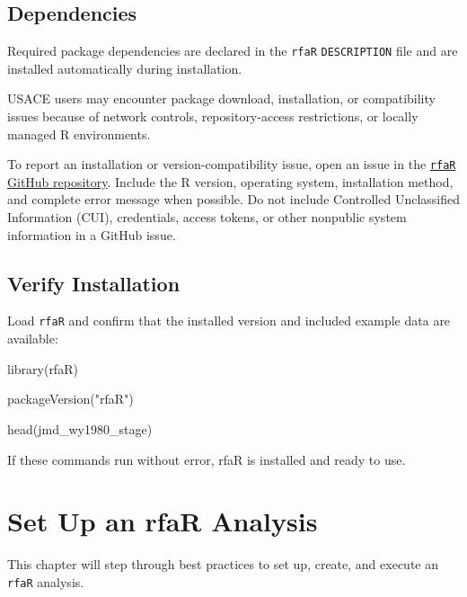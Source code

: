 \documentclass[
  letterpaper,
  DIV=11,
  numbers=noendperiod]{scrreprt}
\newenvironment{Shaded}{\begin{snugshade}}{\end{snugshade}}
\newcommand{\FunctionTok}[1]{\textcolor[rgb]{0.28,0.35,0.67}{#1}}
\newcommand{\NormalTok}[1]{\textcolor[rgb]{0.00,0.23,0.31}{#1}}
\newcommand{\StringTok}[1]{\textcolor[rgb]{0.13,0.47,0.30}{#1}}
\begin{document}
\section{Dependencies}\label{dependencies}

Required package dependencies are declared in the \texttt{rfaR}
\texttt{DESCRIPTION} file and are installed automatically during
installation.

USACE users may encounter package download, installation, or
compatibility issues because of network controls, repository-access
restrictions, or locally managed R environments.

To report an installation or version-compatibility issue, open an issue
in the \href{https://github.com/USACE-RMC/rfaR/issues}{\texttt{rfaR}
GitHub repository}. Include the R version, operating system,
installation method, and complete error message when possible. Do not
include Controlled Unclassified Information (CUI), credentials, access
tokens, or other nonpublic system information in a GitHub issue.

\section{Verify Installation}\label{verify-installation}

Load \texttt{rfaR} and confirm that the installed version and included
example data are available:

\begin{Shaded}
\begin{Highlighting}[]
\FunctionTok{library}\NormalTok{(rfaR)}

\FunctionTok{packageVersion}\NormalTok{(}\StringTok{"rfaR"}\NormalTok{)}

\FunctionTok{head}\NormalTok{(jmd\_wy1980\_stage)}
\end{Highlighting}
\end{Shaded}

If these commands run without error, rfaR is installed and ready to use.


\chapter{Set Up an rfaR Analysis}\label{set-up-an-rfar-analysis}

This chapter will step through best practices to set up, create, and
execute an \texttt{rfaR} analysis.
\end{document}
